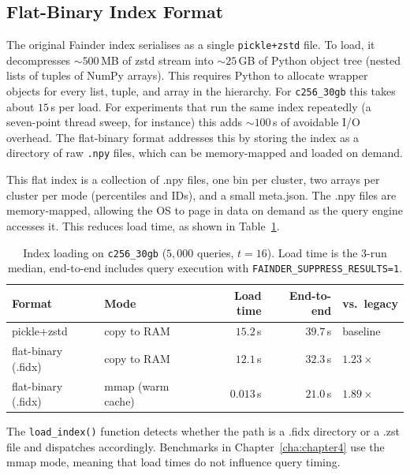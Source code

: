 \subsection{Flat-Binary Index Format\label{sec:method:impl:serial}}

The original Fainder index serialises as a single \texttt{pickle+zstd} file. To load, it decompresses $\sim\!500$\,MB of zstd stream into $\sim\!25$\,GB of Python object tree (nested lists of tuples of NumPy arrays). This requires Python to allocate wrapper objects for every list, tuple, and array in the hierarchy. For \texttt{c256\_30gb} this takes about $15$\,s per load. For experiments that run the same index repeatedly (a seven-point thread sweep, for instance) this adds $\sim\!100$\,s of avoidable I/O overhead. The flat-binary format addresses this by storing the index as a directory of raw \texttt{.npy} files, which can be memory-mapped and loaded on demand.

This flat index is a collection of .npy files, one bin per cluster, two arrays per cluster per mode (percentiles and IDs), and a small meta.json. The .npy files are memory-mapped, allowing the OS to page in data on demand as the query engine accesses it. This reduces load time, as shown in Table~\ref{tab:method:serial}.

\begin{table}[H]
    \centering
    \caption[Index-loading formats and load times.]{Index loading on \texttt{c256\_30gb} ($5{,}000$ queries, $t{=}16$). Load time is the 3-run median, end-to-end includes query execution with \texttt{FAINDER\_SUPPRESS\_RESULTS=1}.}
    \label{tab:method:serial}
    \begin{tabular}{llrrl}
        \toprule
        Format & Mode & Load time & End-to-end & vs.\ legacy \\
        \midrule
        pickle+zstd         & copy to RAM      & $15.2$\,s & $39.7$\,s & baseline \\
        flat-binary (.fidx) & copy to RAM      & $12.1$\,s & $32.3$\,s & $1.23\times$ \\
        flat-binary (.fidx) & mmap (warm cache) & $0.013$\,s & $21.0$\,s & $1.89\times$ \\
        \bottomrule
    \end{tabular}
\end{table}

The \texttt{load\_index()} function detects whether the path is a .fidx directory or a .zst file and dispatches accordingly. Benchmarks in Chapter~\ref{cha:chapter4} use the mmap mode, meaning that load times do not influence query timing.

